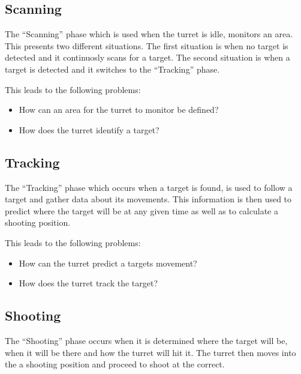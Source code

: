 \subsection{Scanning}
The ``Scanning'' phase which is used when the turret is idle, monitors an
area. This presents two different situations. The first situation is when no
target is detected and it continuosly scans for a target. The second situation
is when a target is detected and it switches to the ``Tracking'' phase.\nl

This leads to the following problems:
\begin{itemize}
  \item How can an area for the turret to monitor be defined?
  \item How does the turret identify a target?
\end{itemize}

% 
% 

\subsection{Tracking}
The ``Tracking'' phase which occurs when a target is found, is used to follow a
target and gather data about its movements. This information is then used to
predict where the target will be at any given time as well as to calculate a
shooting position.\nl

This leads to the following problems:
\begin{itemize}
  \item How can the turret predict a targets movement?
  \item How does the turret track the target?
\end{itemize}

\subsection{Shooting}
The ``Shooting'' phase occurs when it is determined where the target will be,
when it will be there and how the turret will hit it. The turret then moves
into the a shooting position and proceed to shoot at the correct.\nl


